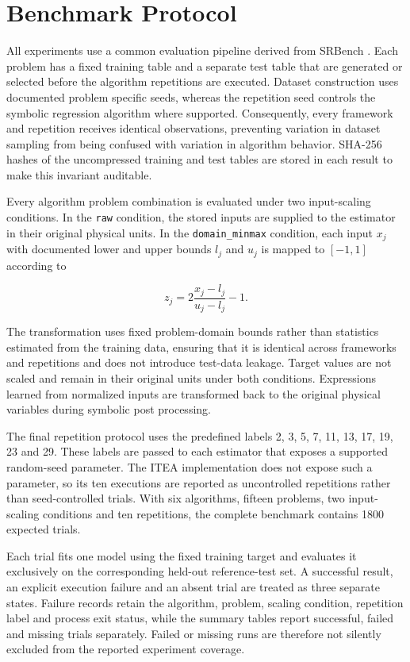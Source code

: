 \documentclass[12pt,oneside,bibtotoc,liststotoc]{scrbook}
\begin{document}
\section{Benchmark Protocol}

All experiments use a common evaluation pipeline derived from SRBench \cite{lacava2021contemporary,srbenchRepository}. Each problem has a fixed training table and a separate test table that are generated or selected before the algorithm repetitions are executed. Dataset construction uses documented problem specific seeds, whereas the repetition seed controls the symbolic regression algorithm where supported. Consequently, every framework and repetition receives identical observations, preventing variation in dataset sampling from being confused with variation in algorithm behavior. SHA-256 hashes of the uncompressed training and test tables are stored in each result to make this invariant auditable.

Every algorithm problem combination is evaluated under two input-scaling conditions. In the \texttt{raw} condition, the stored inputs are supplied to the estimator in their original physical units. In the \texttt{domain\_minmax} condition, each input $x_j$ with documented lower and upper bounds $l_j$ and $u_j$ is mapped to $[-1,1]$ according to

\begin{equation}
    z_j = 2\frac{x_j-l_j}{u_j-l_j}-1.
\end{equation}

The transformation uses fixed problem-domain bounds rather than statistics estimated from the training data, ensuring that it is identical across frameworks and repetitions and does not introduce test-data leakage. Target values are not scaled and remain in their original units under both conditions. Expressions learned from normalized inputs are transformed back to the original physical variables during symbolic post processing.

The final repetition protocol uses the predefined labels 2, 3, 5, 7, 11, 13, 17, 19, 23 and 29. These labels are passed to each estimator that exposes a supported random-seed parameter. The ITEA implementation does not expose such a parameter, so its ten executions are reported as uncontrolled repetitions rather than seed-controlled trials. With six algorithms, fifteen problems, two input-scaling conditions and ten repetitions, the complete benchmark contains 1800 expected trials.

Each trial fits one model using the fixed training target and evaluates it exclusively on the corresponding held-out reference-test set. A successful result, an explicit execution failure and an absent trial are treated as three separate states. Failure records retain the algorithm, problem, scaling condition, repetition label and process exit status, while the summary tables report successful, failed and missing trials separately. Failed or missing runs are therefore not silently excluded from the reported experiment coverage.
\end{document}
